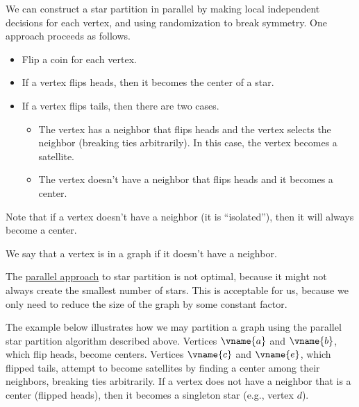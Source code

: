 \begin{flex}
\begin{gram}
\label{graphcon::star::partition::par}

We can construct a star partition in parallel by making local
independent decisions for each vertex, and using randomization to
break symmetry.
%
One approach proceeds as follows. 
%
\begin{itemize}
\item Flip a coin for each vertex.

\item If a vertex flips heads, then it becomes the center of a star. 
\item If a vertex flips tails, then there are two cases.
\begin{itemize}
\item The vertex has a neighbor that flips heads and the vertex selects the neighbor (breaking ties arbitrarily).  In this case, the vertex becomes a satellite.

\item The vertex doesn't have a neighbor that flips heads and it becomes a center. 
\end{itemize}
\end{itemize}

Note that if a vertex doesn't have a neighbor (it is ``isolated''), then it will always become a center. 
\end{gram}

\begin{definition}
\label{graphcon::star::partition::random::isolated}
We say that a vertex is  in a graph if it doesn't have a neighbor.
\end{definition}

\begin{note}
The \href{graphcon::star::partition::par}{parallel approach}
%
to star partition is not optimal, because it might not always create
the smallest number of stars.
%
This is acceptable for us, because we only need to reduce the size of
the graph by some constant factor.
\end{note}

\begin{example}
\label{ex:graphcon::star::partition::random}

The example below illustrates how we may partition a graph using the parallel star partition algorithm described above.
%
Vertices $\vname{a}$ and $\vname{b}$, which flip heads, become
centers. Vertices $\vname{c}$ and $\vname{e}$, which flipped tails,
attempt to become satellites by finding a center among their
neighbors, breaking ties arbitrarily.
%
If a vertex does not have a neighbor that is a center (flipped heads),
then it becomes a singleton star (e.g., vertex $d$).
%


\end{example}
\end{flex}

